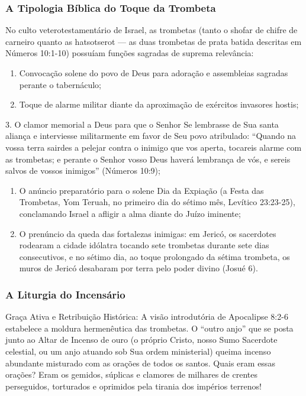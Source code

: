 \subsubsection*{A Tipologia Bíblica do Toque da Trombeta}
No culto veterotestamentário de Israel, as trombetas (tanto o shofar de chifre de carneiro quanto as hatsotserot — as duas trombetas de prata batida descritas em Números 10:1-10) possuíam funções sagradas de suprema relevância:
\begin{enumerate}
  \item Convocação solene do povo de Deus para adoração e assembleias sagradas perante o tabernáculo;
  \item Toque de alarme militar diante da aproximação de exércitos invasores hostis;
\end{enumerate}

3. O clamor memorial a Deus para que o Senhor Se lembrasse de Sua santa aliança e interviesse militarmente em favor de Seu povo atribulado: ``Quando na vossa terra sairdes a pelejar contra o inimigo que vos aperta, tocareis alarme com as trombetas; e perante o Senhor vosso Deus haverá lembrança de vós, e sereis salvos de vossos inimigos'' (Números 10:9);
\begin{enumerate}
  \item O anúncio preparatório para o solene Dia da Expiação (a Festa das Trombetas, Yom Teruah, no primeiro dia do sétimo mês, Levítico 23:23-25), conclamando Israel a afligir a alma diante do Juízo iminente;
  \item O prenúncio da queda das fortalezas inimigas: em Jericó, os sacerdotes rodearam a cidade idólatra tocando sete trombetas durante sete dias consecutivos, e no sétimo dia, ao toque prolongado da sétima trombeta, os muros de Jericó desabaram por terra pelo poder divino (Josué 6).
\end{enumerate}



\subsubsection*{A Liturgia do Incensário}
Graça Ativa e Retribuição Histórica:
A visão introdutória de Apocalipse 8:2-6 estabelece a moldura hermenêutica das trombetas. O ``outro anjo'' que se posta junto ao Altar de Incenso de ouro (o próprio Cristo, nosso Sumo Sacerdote celestial, ou um anjo atuando sob Sua ordem ministerial) queima incenso abundante misturado com as orações de todos os santos. Quais eram essas orações? Eram os gemidos, súplicas e clamores de milhares de crentes perseguidos, torturados e oprimidos pela tirania dos impérios terrenos!

